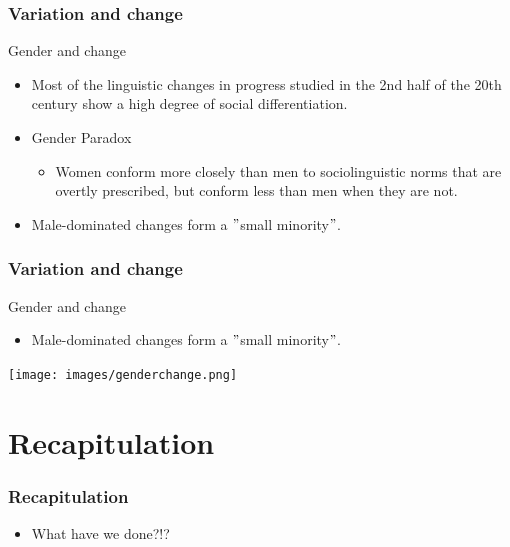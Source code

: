 \documentclass[12pt, table]{beamer}
\begin{document}
\begin{frame}
\frametitle{Variation and change}
Gender and change
\begin{itemize}
\item Most of the linguistic changes in progress studied in the 2nd half of the 20th century show a high degree of social differentiation. \citep{labov2002driving}
\item Gender Paradox 
\begin{itemize}
\item Women conform more closely than men to sociolinguistic norms that are overtly prescribed, but conform less than men when they are not. \citep[293]{labov2001principles} 
\end{itemize}
\item Male-dominated changes form a $"$small minority$"$. \citep[284]{labov2001principles} 
\end{itemize}
\end{frame}

\begin{frame}
\frametitle{Variation and change}
Gender and change
\begin{itemize}
\item Male-dominated changes form a $"$small minority$"$. \citep[284]{labov2001principles} 
\end{itemize}
\texttt{[image: images/genderchange.png]}
\end{frame}

\section{Recapitulation}
\begin{frame}
\frametitle{Recapitulation}
\begin{itemize}
\item What have we done?!?
\end{itemize}
\end{frame}



\end{document}
